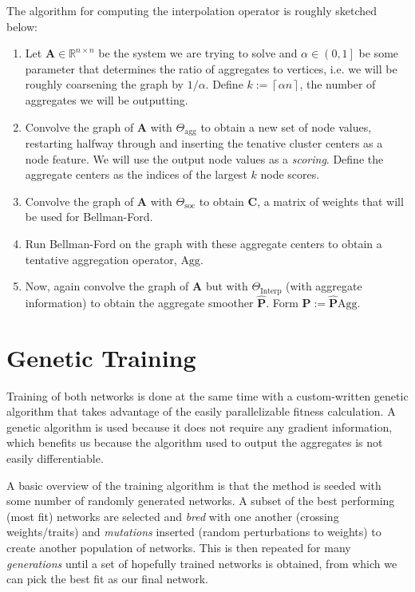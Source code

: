 \documentclass{article}
\newcommand{\mat}[1]{\bm{{#1}}}
\newcommand{\ceil}[1]{\left\lceil #1 \right\rceil}
\begin{document}
The algorithm for computing the interpolation operator is roughly sketched below:
\begin{enumerate}
\item Let $\mat{A} \in \mathbb{R}^{n \times n}$ be the system we are trying to solve and $\alpha \in \left(0, 1\right]$ be some parameter that determines the ratio of aggregates to vertices, i.e. we will be roughly coarsening the graph by $1/\alpha$.  Define $k := \ceil{\alpha n}$, the number of aggregates we will be outputting.
\item Convolve the graph of $\mat{A}$ with $\Theta_{\text{agg}}$ to obtain a new set of node values, restarting halfway through and inserting the tenative cluster centers as a node feature.  We will use the output node values as a \textit{scoring}.  Define the aggregate centers as the indices of the largest $k$ node scores.
\item Convolve the graph of $\mat{A}$ with $\Theta_{\text{soc}}$ to obtain $\mat{C}$, a matrix of weights that will be used for Bellman-Ford.
\item Run Bellman-Ford on the graph with these aggregate centers to obtain a tentative aggregation operator, $\text{Agg}$.
\item Now, again convolve the graph of $\mat{A}$ but with $\Theta_{\text{Interp}}$ (with aggregate information) to obtain the aggregate smoother $\mat{\hat{P}}$.  Form $\mat{P} := \mat{\hat{P}}\text{Agg}$.
\end{enumerate}

\section{Genetic Training}
Training of both networks is done at the same time with a custom-written genetic algorithm that takes advantage of the easily parallelizable fitness calculation.  A genetic algorithm is used because it does not require any gradient information, which benefits us because the algorithm used to output the aggregates is not easily differentiable.

A basic overview of the training algorithm is that the method is seeded with some number of randomly generated networks. A subset of the best performing (most fit) networks are selected and \textit{bred} with one another (crossing weights/traits) and \textit{mutations} inserted (random perturbations to weights) to create another population of networks.  This is then repeated for many \textit{generations} until a set of hopefully trained networks is obtained, from which we can pick the best fit as our final network.
\end{document}
